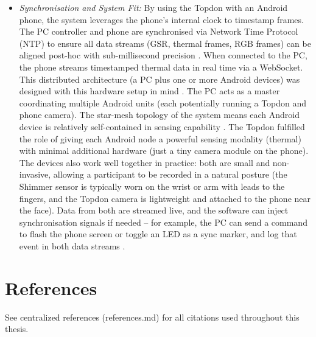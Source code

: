 \begin{itemize}
  \item \emph{Synchronisation and System Fit:} By using the Topdon with an Android phone, the system leverages the phone's internal clock to timestamp frames. The PC controller and phone are synchronised via Network Time Protocol (NTP) to ensure all data streams (GSR, thermal frames, RGB frames) can be aligned post-hoc with sub-millisecond precision \cite{ref15}. When connected to the PC, the phone streams timestamped thermal data in real time via a WebSocket. This distributed architecture (a PC plus one or more Android devices) was designed with this hardware setup in mind \cite{ref15}. The PC acts as a master coordinating multiple Android units (each potentially running a Topdon and phone camera). The star-mesh topology of the system means each Android device is relatively self-contained in sensing capability \cite{ref15}. The Topdon fulfilled the role of giving each Android node a powerful sensing modality (thermal) with minimal additional hardware (just a tiny camera module on the phone). The devices also work well together in practice: both are small and non-invasive, allowing a participant to be recorded in a natural posture (the Shimmer sensor is typically worn on the wrist or arm with leads to the fingers, and the Topdon camera is lightweight and attached to the phone near the face). Data from both are streamed live, and the software can inject synchronisation signals if needed -- for example, the PC can send a command to flash the phone screen or toggle an LED as a sync marker, and log that event in both data streams \cite{ref21}.
\end{itemize}

\section*{References}
See centralized references (references.md) for all citations used throughout this thesis.

